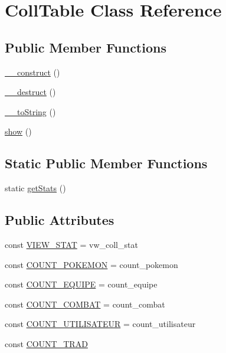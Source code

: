 \hypertarget{class_coll_table}{}\section{Coll\+Table Class Reference}
\label{class_coll_table}
\subsection*{Public Member Functions}
\begin{DoxyCompactItemize}
\item 
\hyperlink{class_coll_table_a349a8bdf7bf6a96ecce40e5b9cedcabf}{\+\_\+\+\_\+construct} ()
\item 
\hyperlink{class_coll_table_aea5380abb2931c4249bc3ea392db9d7a}{\+\_\+\+\_\+destruct} ()
\item 
\hyperlink{class_coll_table_a2b5eaf43b8dfd15a7c152d178d9d5091}{\+\_\+\+\_\+to\+String} ()
\item 
\hyperlink{class_coll_table_ac8acecbbe84e8b6bab76cef45d0d9037}{show} ()
\end{DoxyCompactItemize}
\subsection*{Static Public Member Functions}
\begin{DoxyCompactItemize}
\item 
static \hyperlink{class_coll_table_a373e999ad096597ec5ef76f8ae434a27}{get\+Stats} ()
\end{DoxyCompactItemize}
\subsection*{Public Attributes}
\begin{DoxyCompactItemize}
\item 
const \hyperlink{class_coll_table_a3dd4c5bf0129afb677046e52ee19f11c}{V\+I\+E\+W\+\_\+\+S\+T\+AT} = \textquotesingle{}vw\+\_\+coll\+\_\+stat\textquotesingle{}
\item 
const \hyperlink{class_coll_table_a763bebe7d3934827d5997b3f724fc0c5}{C\+O\+U\+N\+T\+\_\+\+P\+O\+K\+E\+M\+ON} = \textquotesingle{}count\+\_\+pokemon\textquotesingle{}
\item 
const \hyperlink{class_coll_table_a224269a8a8264b43f0a2292d26f5b861}{C\+O\+U\+N\+T\+\_\+\+E\+Q\+U\+I\+PE} = \textquotesingle{}count\+\_\+equipe\textquotesingle{}
\item 
const \hyperlink{class_coll_table_a142fbb2f1ced4fb9cdd7c87e3de50904}{C\+O\+U\+N\+T\+\_\+\+C\+O\+M\+B\+AT} = \textquotesingle{}count\+\_\+combat\textquotesingle{}
\item 
const \hyperlink{class_coll_table_a3e0bf079d75f9b5f71878cb5b5408e24}{C\+O\+U\+N\+T\+\_\+\+U\+T\+I\+L\+I\+S\+A\+T\+E\+UR} = \textquotesingle{}count\+\_\+utilisateur\textquotesingle{}
\item 
const \hyperlink{class_coll_table_ab79c7a291bc2c6af3798edbd15b2fd5f}{C\+O\+U\+N\+T\+\_\+\+T\+R\+AD}
\end{DoxyCompactItemize}
